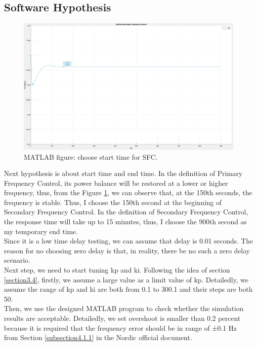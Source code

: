\documentclass{report}
\begin{document}
\subsection{Software Hypothesis} %

\begin{figure}[htbp]
\centering
\includegraphics[width = .891\textwidth]{figure/4_1_1_without3.jpeg}
\caption{MATLAB figure: choose start time for SFC.}
\label{4_1_1_without3}
\end{figure}
Next hypothesis is about start time and end time. In the definition of Primary Frequency Control, its power balance will be restored at a lower or higher frequency, thus, from the Figure \textcolor{red}{\ref{4_1_1_without3}}, we can observe that, at the 150th seconds, the frequency is stable. Thus, I choose the 150th second at the beginning of Secondary Frequency Control. In the definition of Secondary Frequency Control, the response time will take up to 15 minutes, thus, I choose the 900th second as my temporary end time.\\

Since it is a low time delay testing, we can assume that delay is 0.01 seconds. The reason for no choosing zero delay is that, in reality, there be no such a zero delay scenario.\\

Next step, we need to start tuning kp and ki. Following the idea of section \textcolor{red}{\ref{section3.4}}, firstly, we assume a large value as a limit value of kp. Detailedly, we assume the range of kp and ki are both from 0.1 to 300.1 and their steps are both 50. \\

Then, we use the designed MATLAB program to check whether the simulation results are acceptable. Detailedly, we set overshoot is smaller than 0.2 percent because it is required that the frequency error should be in range of ±0.1 Hz from Section \textcolor{red}{\ref{subsection4.1.1}} in the Nordic official document.\\
\end{document}
